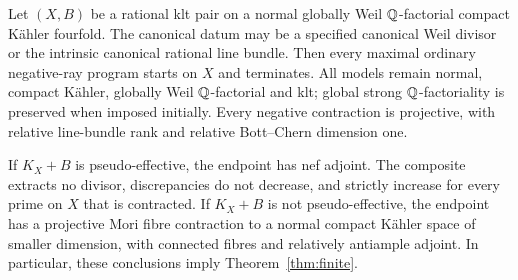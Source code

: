 \begin{theorem}
\label{repair:thm:reduction}
Let $(X,B)$ be a rational klt pair on a normal globally Weil
$\mathbb Q$-factorial compact K\"ahler fourfold. The canonical datum may
be a specified canonical Weil divisor or the intrinsic canonical
rational line bundle. Then every maximal ordinary negative-ray
program starts on $X$ and terminates. All models remain normal,
compact K\"ahler, globally Weil $\mathbb Q$-factorial and klt; global
strong $\mathbb Q$-factoriality is preserved when imposed initially.
Every negative contraction is projective, with relative
line-bundle rank and relative Bott--Chern dimension one.

If $K_X+B$ is pseudo-effective, the endpoint has nef adjoint. The
composite extracts no divisor, discrepancies do not decrease, and
strictly increase for every prime on $X$ that is contracted. If
$K_X+B$ is not pseudo-effective, the endpoint has a projective
Mori fibre contraction to a normal compact K\"ahler space of
smaller dimension, with connected fibres and relatively
antiample adjoint. In particular, these conclusions imply Theorem~\ref{thm:finite}.
\end{theorem}
